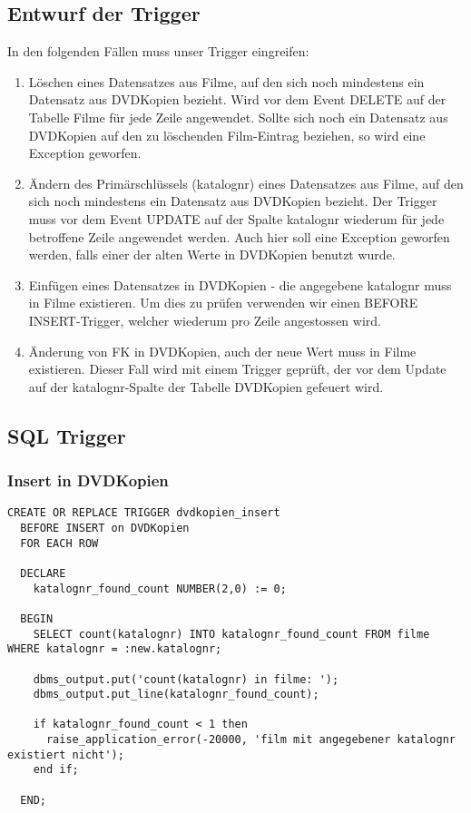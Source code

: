 \documentclass[11pt,a4paper,parskip=half]{scrartcl}
\begin{document}
\subsection{Entwurf der Trigger}
In den folgenden Fällen muss unser Trigger eingreifen:
\begin{enumerate}
	\item{Löschen eines Datensatzes aus Filme, auf den sich noch mindestens ein Datensatz aus DVDKopien bezieht. Wird vor dem Event DELETE auf der Tabelle Filme für jede Zeile angewendet. Sollte sich noch ein Datensatz aus DVDKopien auf den zu löschenden Film-Eintrag beziehen, so wird eine Exception geworfen.}
	\item{Ändern des Primärschlüssels (katalognr) eines Datensatzes aus Filme, auf den sich noch mindestens ein Datensatz aus DVDKopien bezieht. Der Trigger muss vor dem Event UPDATE auf der Spalte katalognr wiederum für jede betroffene Zeile angewendet werden. Auch hier soll eine Exception geworfen werden, falls einer der alten Werte in DVDKopien benutzt wurde.}
	\item{Einfügen eines Datensatzes in DVDKopien - die angegebene katalognr muss in Filme existieren. Um dies zu prüfen verwenden wir einen BEFORE INSERT-Trigger, welcher wiederum pro Zeile angestossen wird.}
	\item{Änderung von FK in DVDKopien, auch der neue Wert muss in Filme existieren. Dieser Fall wird mit einem Trigger geprüft, der vor dem Update auf der katalognr-Spalte der Tabelle DVDKopien gefeuert wird.}
\end{enumerate}

\subsection{SQL Trigger}
\subsubsection{Insert in DVDKopien}
\begin{lstlisting}
CREATE OR REPLACE TRIGGER dvdkopien_insert
  BEFORE INSERT on DVDKopien
  FOR EACH ROW
  
  DECLARE
    katalognr_found_count NUMBER(2,0) := 0;
    
  BEGIN
    SELECT count(katalognr) INTO katalognr_found_count FROM filme WHERE katalognr = :new.katalognr;
    
    dbms_output.put('count(katalognr) in filme: ');
    dbms_output.put_line(katalognr_found_count);
    
    if katalognr_found_count < 1 then
      raise_application_error(-20000, 'film mit angegebener katalognr existiert nicht');
    end if;
    
  END;
\end{lstlisting}
\end{document}
